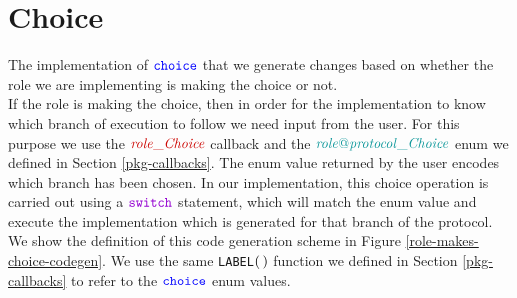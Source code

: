 \documentclass[12pt,twoside]{report}
\begin{document}
            
            
            
            


\section{Choice}\label{choice-impl}
The implementation of ${\color{blue}\mathtt{choice}}$ that we generate changes based on whether the role we are implementing is making the choice or not.\\

If the role is making the choice, then in order for the implementation to know which branch of execution to follow we need input from the user. For this purpose we use the $\functionname{role\_Choice}$ callback and the $\enumtype{role@protocol\_Choice}$ enum we defined in Section \ref{pkg-callbacks}. The enum value returned by the user encodes which branch has been chosen. In our implementation, this choice operation is carried out using a $\goswitch$ statement, which will match the enum value and execute the implementation which is generated for that branch of the protocol. We show the definition of this code generation scheme in Figure \ref{role-makes-choice-codegen}. We use the same \texttt{LABEL}$(\,)$ function we defined in Section \ref{pkg-callbacks} to refer to the ${\color{blue}\mathtt{choice}}$ enum values.\\
\end{document}
